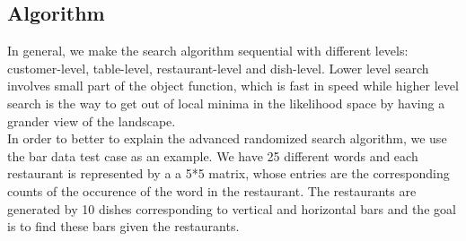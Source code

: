\documentclass{article}
\begin{document}
\subsection{Algorithm}
In general, we make the search algorithm sequential with different levels: customer-level, table-level, restaurant-level and dish-level. Lower level search involves small part of the object function, which is fast in speed while higher level search is the way to get out of local minima in the likelihood space by having a grander view of the landscape.
\\In order to better to explain the advanced randomized search algorithm, we use the bar data test case as an example.
We have 25 different words and each restaurant is represented by a a 5*5 matrix, whose entries are the corresponding counts of the occurence of the word in the restaurant.
The restaurants are generated by 10 dishes corresponding to vertical and horizontal bars and the goal is to find these bars given the restaurants.
\end{document}
